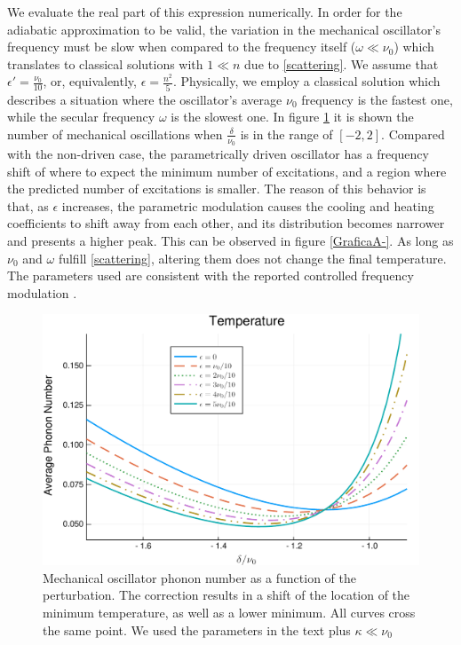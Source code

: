 \documentclass[reprint, amsmath,amssymb, aps,pra]{revtex4-1}
\begin{document}
We evaluate the real part of this expression numerically. In order for
the adiabatic approximation to be valid, the variation in the
mechanical oscillator's frequency must be slow when compared to the
frequency itself ($\omega \ll \nu_0$) which translates to classical
solutions with $1 \ll n$ due to \eqref{scattering}. We assume that
$\epsilon' = \frac{\nu_0}{10}$, or, equivalently, $\epsilon = \frac{n^2}{5}$. Physically,
we employ a classical solution which describes a situation where the
oscillator's average $\nu_0$ frequency is the fastest one, while the
secular frequency $\omega$ is the slowest one. In figure \ref{GraficaTemp} it is shown the
number of mechanical oscillations when $\frac{\delta}{\nu_0}$ is in
the range of $[-2,2]$. Compared with the non-driven case, the
parametrically driven oscillator has a frequency shift of where to
expect the minimum number of excitations, and a region where the
predicted number of excitations is smaller. The reason of this
behavior is that, as $\epsilon$ increases, the parametric modulation
causes the cooling and heating coefficients to shift away from each
other, and its distribution becomes narrower and presents a higher
peak. This can be observed in figure \ref{GraficaA-}. As long as
$\nu_0$ and $\omega$ fulfill \eqref{scattering}, altering them does
not change the final temperature. The parameters used are consistent
with the reported controlled frequency modulation
\cite{WoolleyNM}\cite{JockelS}. 



\begin{figure}
\includegraphics[scale=.4]{GraficaTemp.pdf}  
\caption{ Mechanical oscillator phonon number as a function of the
  perturbation. The correction results in a shift of the location of
  the minimum temperature, as well as a lower minimum. All curves
  cross the same point. We used the parameters in the text plus
  $\kappa \ll \nu_0$}
\label{GraficaTemp}
\end{figure}
\end{document}
